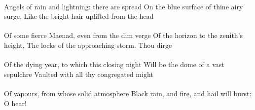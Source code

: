 \documentclass{article}
\begin{document}
			\paragraph{}
				Angels of rain and lightning: there are spread
				On the blue surface of thine airy surge,
				Like the bright hair uplifted from the head
			\paragraph{}
				Of some fierce Maenad, even from the dim verge
				Of the horizon to the zenith’s height,
				The locks of the approaching storm. Thou dirge
			\paragraph{}
				Of the dying year, to which this closing night
				Will be the dome of a vast sepulchre
				Vaulted with all thy congregated might
			\paragraph{}
				Of vapours, from whose solid atmosphere
				Black rain, and fire, and hail will burst: O hear!
\end{document}
